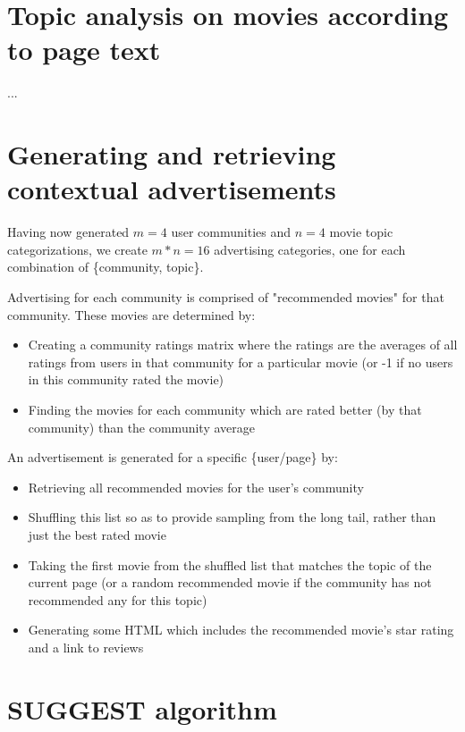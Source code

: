 \documentclass[11pt]{article}
\begin{document}
\section{Topic analysis on movies according to page text}

...


\section{Generating and retrieving contextual advertisements}

Having now generated $m = 4$ user communities and $n = 4$ movie topic categorizations, we create $m * n = 16$ advertising categories, one for each combination of \{community, topic\}.\newline

Advertising for each community is comprised of "recommended movies" for that community. These movies are determined by:

\begin{itemize}
    \item Creating a community ratings matrix where the ratings are the averages of all ratings from users in that community for a particular movie (or -1 if no users in this community rated the movie)
    \item Finding the movies for each community which are rated better (by that community) than the community average
\end{itemize}

An advertisement is generated for a specific \{user/page\} by:

\begin{itemize}
    \item Retrieving all recommended movies for the user's community
    \item Shuffling this list so as to provide sampling from the long tail, rather than just the best rated movie
    \item Taking the first movie from the shuffled list that matches the topic of the current page (or a random recommended movie if the community has not recommended any for this topic)
    \item Generating some HTML which includes the recommended movie's star rating and a link to reviews
\end{itemize}


\section{SUGGEST algorithm}
\end{document}
